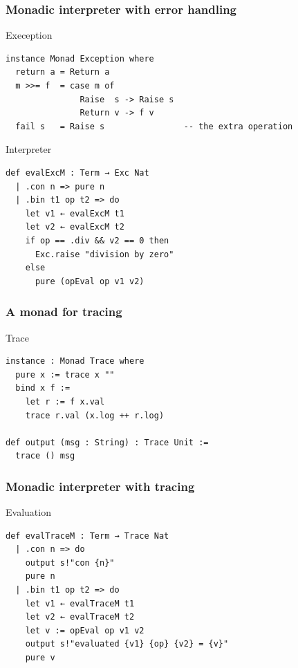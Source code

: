 \documentclass{beamer}
\begin{document}
\begin{frame}[fragile]
  \frametitle{Monadic interpreter with error handling}
  \begin{alertblock}{Exeception}
\begin{lstlisting}
instance Monad Exception where
  return a = Return a
  m >>= f  = case m of 
               Raise  s -> Raise s
               Return v -> f v
  fail s   = Raise s                -- the extra operation
\end{lstlisting}  
\end{alertblock}

\begin{exampleblock}{Interpreter}
\begin{lstlisting}
def evalExcM : Term → Exc Nat
  | .con n => pure n
  | .bin t1 op t2 => do
    let v1 ← evalExcM t1
    let v2 ← evalExcM t2
    if op == .div && v2 == 0 then
      Exc.raise "division by zero"
    else
      pure (opEval op v1 v2)
\end{lstlisting}  
\end{exampleblock}
\end{frame}             



\begin{frame}[fragile]
  \frametitle{A monad for tracing}
  \begin{alertblock}{Trace}
\begin{lstlisting}
instance : Monad Trace where
  pure x := trace x ""
  bind x f :=
    let r := f x.val
    trace r.val (x.log ++ r.log)

def output (msg : String) : Trace Unit :=
  trace () msg
\end{lstlisting}  
\end{alertblock}
\end{frame}

\begin{frame}[fragile]
 \frametitle{Monadic interpreter with tracing}
 \begin{exampleblock}{Evaluation}
\begin{lstlisting}
def evalTraceM : Term → Trace Nat
  | .con n => do
    output s!"con {n}"
    pure n
  | .bin t1 op t2 => do
    let v1 ← evalTraceM t1
    let v2 ← evalTraceM t2
    let v := opEval op v1 v2
    output s!"evaluated {v1} {op} {v2} = {v}"
    pure v
\end{lstlisting}
\end{exampleblock}      
\end{frame}             
\end{document}

